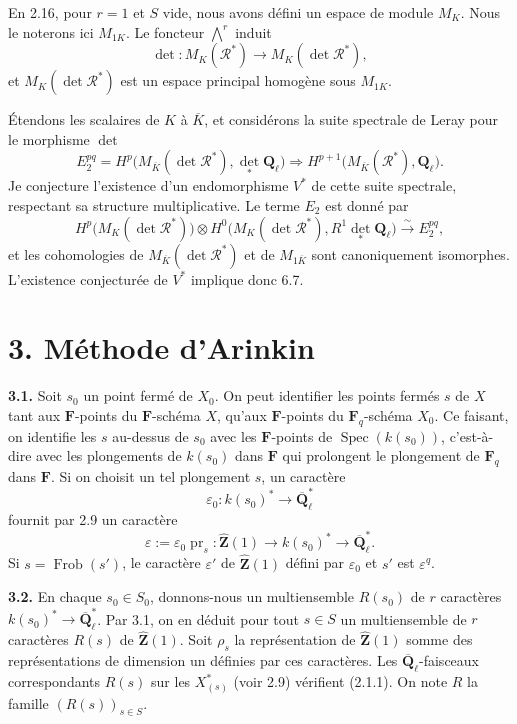 \documentclass[11pt]{article}
\newcommand{\Fq}{\mathbf{F}_q}
\newcommand{\F}{\mathbf{F}}
\newcommand{\Qbl}{\overline{\mathbf{Q}}_{\ell}}
\newcommand{\Ql}{\mathbf{Q}_{\ell}}
\newcommand{\Spec}{\operatorname{Spec}}
\newcommand{\Frob}{\operatorname{Frob}}
\newcommand{\Zhat}{\widehat{\mathbf{Z}}}
\newcommand{\Rcal}{\mathcal{R}}
\newcommand{\para}[1]{\medskip\noindent\textbf{#1}\enspace}
\begin{document}
En 2.16, pour \(r=1\) et \(S\) vide, nous avons défini un espace de module \(M_K\). Nous le noterons ici \(M_{1K}\). Le foncteur \(\bigwedge^r\) induit
\begin{equation}
\det:M_K(\Rcal^*)\to M_K(\det\Rcal^*),
\tag{2.22.2}
\end{equation}
et \(M_K(\det\Rcal^*)\) est un espace principal homogène sous \(M_{1K}\).

Étendons les scalaires de \(K\) à \(\overline K\), et considérons la suite spectrale de Leray pour le morphisme \(\det\)
\[
E_2^{pq}=H^p\bigl(M_{\overline K}(\det\Rcal^*),\det_*\Ql\bigr)\Rightarrow H^{p+1}\bigl(M_{\overline K}(\Rcal^*),\Ql\bigr).
\]
Je conjecture l'existence d'un endomorphisme \(V^*\) de cette suite spectrale, respectant sa structure multiplicative. Le terme \(E_2\) est donné par
\[
H^p\bigl(M_K(\det\Rcal^*)\bigr)\otimes H^0\bigl(M_K(\det\Rcal^*),R^1\det_*\Ql\bigr)\xrightarrow{\sim} E_2^{pq},
\]
et les cohomologies de \(M_{\overline K}(\det\Rcal^*)\) et de \(M_{1\overline K}\) sont canoniquement isomorphes. L'existence conjecturée de \(V^*\) implique donc 6.7.


\section*{3. Méthode d'Arinkin}
\para{3.1.} Soit \(s_0\) un point fermé de \(X_0\). On peut identifier les points fermés \(s\) de \(X\) tant aux \(\F\)-points du \(\F\)-schéma \(X\), qu'aux \(\F\)-points du \(\Fq\)-schéma \(X_0\). Ce faisant, on identifie les \(s\) au-dessus de \(s_0\) avec les \(\F\)-points de \(\Spec(k(s_0))\), c'est-à-dire avec les plongements de \(k(s_0)\) dans \(\F\) qui prolongent le plongement de \(\Fq\) dans \(\F\). Si on choisit un tel plongement \(s\), un caractère
\[
  \varepsilon_0:k(s_0)^*\longrightarrow \Qbl^*
\]
fournit par 2.9 un caractère
\[
  \varepsilon:=\varepsilon_0\operatorname{pr}_s:\Zhat(1)\longrightarrow k(s_0)^*\longrightarrow\Qbl^* .
\]
Si \(s=\Frob(s')\), le caractère \(\varepsilon'\) de \(\Zhat(1)\) défini par \(\varepsilon_0\) et \(s'\) est \(\varepsilon^q\).

\para{3.2.} En chaque \(s_0\in S_0\), donnons-nous un multiensemble \(R(s_0)\) de \(r\) caractères \(k(s_0)^*\to\Qbl^*\). Par 3.1, on en déduit pour tout \(s\in S\) un multiensemble de \(r\) caractères \(R(s)\) de \(\Zhat(1)\). Soit \(\rho_s\) la représentation de \(\Zhat(1)\) somme des représentations de dimension un définies par ces caractères. Les \(\Qbl\)-faisceaux correspondants \(R(s)\) sur les \(X_{(s)}^*\) (voir 2.9) vérifient (2.1.1). On note \(R\) la famille \((R(s))_{s\in S}\).
\end{document}
